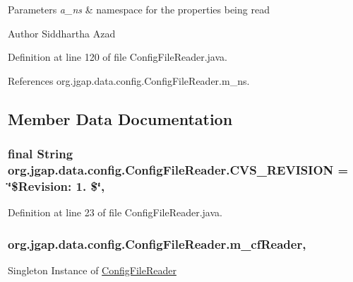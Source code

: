\begin{DoxyParams}{Parameters}
{\em a\-\_\-ns} & namespace for the properties being read\\
\hline
\end{DoxyParams}
\begin{DoxyAuthor}{Author}
Siddhartha Azad 
\end{DoxyAuthor}


Definition at line 120 of file Config\-File\-Reader.\-java.



References org.\-jgap.\-data.\-config.\-Config\-File\-Reader.\-m\-\_\-ns.



\subsection{Member Data Documentation}
\hypertarget{classorg_1_1jgap_1_1data_1_1config_1_1_config_file_reader_a56f38aafb001e64d57bc443040cc9f1b}{
\subsubsection[{C\-V\-S\-\_\-\-R\-E\-V\-I\-S\-I\-O\-N}]{\setlength{\rightskip}{0pt plus 5cm}final String org.\-jgap.\-data.\-config.\-Config\-File\-Reader.\-C\-V\-S\-\_\-\-R\-E\-V\-I\-S\-I\-O\-N = \char`\"{}\$Revision\-: 1. \$\char`\"{}\hspace{0.3cm}{\ttfamily [static]}, {\ttfamily [private]}}}\label{classorg_1_1jgap_1_1data_1_1config_1_1_config_file_reader_a56f38aafb001e64d57bc443040cc9f1b}


Definition at line 23 of file Config\-File\-Reader.\-java.

\hypertarget{classorg_1_1jgap_1_1data_1_1config_1_1_config_file_reader_ad2f45ac322434ebc63c0eb354b2345ed}{
\subsubsection[{m\-\_\-cf\-Reader}]{ org.\-jgap.\-data.\-config.\-Config\-File\-Reader.\-m\-\_\-cf\-Reader\hspace{0.3cm}{\ttfamily [static]}, {\ttfamily [private]}}}\label{classorg_1_1jgap_1_1data_1_1config_1_1_config_file_reader_ad2f45ac322434ebc63c0eb354b2345ed}
Singleton Instance of \hyperlink{classorg_1_1jgap_1_1data_1_1config_1_1_config_file_reader}{Config\-File\-Reader} 

